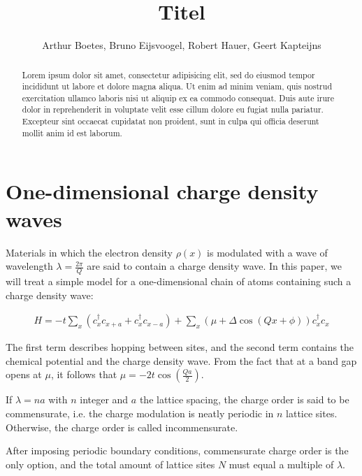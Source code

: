 \documentclass[letterpaper, 10 pt, conference]{ieeeconf}  %
\title{\LARGE \bf
  Titel
}
\author{Arthur Boetes, Bruno Eijsvoogel, Robert Hauer, Geert Kapteijns
}
\begin{document}
\maketitle
\thispagestyle{empty}
\pagestyle{empty}


\begin{abstract}

Lorem ipsum dolor sit amet, consectetur adipisicing elit, sed do eiusmod tempor
incididunt ut labore et dolore magna aliqua. Ut enim ad minim veniam, quis
nostrud exercitation ullamco laboris nisi ut aliquip ex ea commodo consequat.
Duis aute irure dolor in reprehenderit in voluptate velit esse cillum dolore eu
fugiat nulla pariatur. Excepteur sint occaecat cupidatat non proident, sunt in
culpa qui officia deserunt mollit anim id est laborum.
\end{abstract}


\section{One-dimensional charge density waves}

Materials in which the electron density $\rho(x)$ is modulated with a wave of
wavelength $\lambda = \frac{2\pi}{Q}$ are said to contain a charge density wave.
In this paper, we will treat a simple model for a one-dimensional chain of atoms containing such a charge density wave:

\begin{align}
H = -t \sum_x (c_x^{\dagger}c_{x+a} + c_x^{\dagger}c_{x-a}) + \sum_x (\mu + \Delta \cos(Qx + \phi))c_x^{\dagger}c_x
\end{align}

The first term describes hopping between sites, and the second term contains the chemical potential and the charge density wave. From the fact that at a band gap opens at $\mu$, it follows that $\mu = -2t\cos(\frac{Qa}{2})$.

If $\lambda = n a$ with $n$ integer and $a$ the lattice spacing, the charge order is said to be commensurate, i.e. the charge modulation is neatly periodic in $n$ lattice sites. Otherwise, the charge order is called incommensurate.

After imposing periodic boundary conditions, commensurate charge order is the only option, and the total amount of lattice sites $N$ must equal a multiple of $\lambda$.
\end{document}
